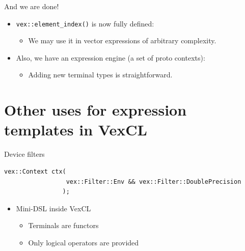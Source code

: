 \documentclass[@BEAMER_OPTIONS@]{beamer}
\newcommand{\code}[1]{\lstinline|#1|}
\begin{document}
\begin{frame}[fragile]{And we are done!}
    \begin{itemize}
        \item \code{vex::element_index()} is now fully defined:
            \begin{itemize}
                \item We may use it in vector expressions of arbitrary
                    complexity.
            \end{itemize}
            \vspace{\baselineskip}
        \item Also, we have an expression engine (a set of proto contexts):
            \begin{itemize}
                \item Adding new terminal types is straightforward.
            \end{itemize}
    \end{itemize}
\end{frame}

\note{}

\section{Other uses for expression templates in VexCL}
\begin{frame}
    \sectionpage
\end{frame}

\note{}

\begin{frame}[fragile]{Device filters}
    \begin{exampleblock}{}
        \begin{lstlisting}
vex::Context ctx(
                 vex::Filter::Env && vex::Filter::DoublePrecision
                );
        \end{lstlisting}
    \end{exampleblock}
    \begin{itemize}
        \item Mini-DSL inside VexCL
            \begin{itemize}
                \item Terminals are functors
                \item Only logical operators are provided
            \end{itemize}
    \end{itemize}
\end{frame}
\end{document}
